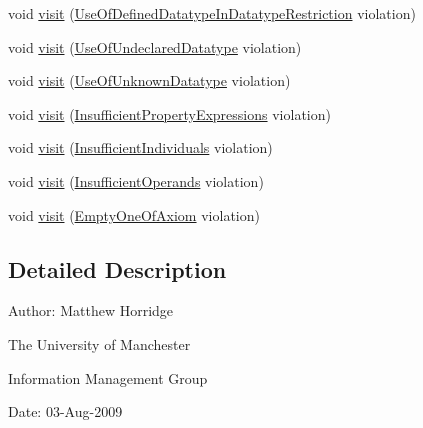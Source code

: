 \begin{DoxyCompactItemize}
\item 
void \hyperlink{interfaceorg_1_1semanticweb_1_1owlapi_1_1profiles_1_1_o_w_l2_profile_violation_visitor_a5df8a27131f27b257a3e48016ae8f249}{visit} (\hyperlink{classorg_1_1semanticweb_1_1owlapi_1_1profiles_1_1_use_of_defined_datatype_in_datatype_restriction}{Use\-Of\-Defined\-Datatype\-In\-Datatype\-Restriction} violation)
\item 
void \hyperlink{interfaceorg_1_1semanticweb_1_1owlapi_1_1profiles_1_1_o_w_l2_profile_violation_visitor_adde3c5181b195728efc45c667057193c}{visit} (\hyperlink{classorg_1_1semanticweb_1_1owlapi_1_1profiles_1_1_use_of_undeclared_datatype}{Use\-Of\-Undeclared\-Datatype} violation)
\item 
void \hyperlink{interfaceorg_1_1semanticweb_1_1owlapi_1_1profiles_1_1_o_w_l2_profile_violation_visitor_a05ed324b2c069fd3b197cdeae61a5e42}{visit} (\hyperlink{classorg_1_1semanticweb_1_1owlapi_1_1profiles_1_1_use_of_unknown_datatype}{Use\-Of\-Unknown\-Datatype} violation)
\item 
void \hyperlink{interfaceorg_1_1semanticweb_1_1owlapi_1_1profiles_1_1_o_w_l2_profile_violation_visitor_a735db5f3b4ad0df17a7faa32c4bdeda8}{visit} (\hyperlink{classorg_1_1semanticweb_1_1owlapi_1_1profiles_1_1_insufficient_property_expressions}{Insufficient\-Property\-Expressions} violation)
\item 
void \hyperlink{interfaceorg_1_1semanticweb_1_1owlapi_1_1profiles_1_1_o_w_l2_profile_violation_visitor_a906037ef8cf204ccd36a44aa2a122146}{visit} (\hyperlink{classorg_1_1semanticweb_1_1owlapi_1_1profiles_1_1_insufficient_individuals}{Insufficient\-Individuals} violation)
\item 
void \hyperlink{interfaceorg_1_1semanticweb_1_1owlapi_1_1profiles_1_1_o_w_l2_profile_violation_visitor_a5606e730dc87b14de6803153ceebd3ee}{visit} (\hyperlink{classorg_1_1semanticweb_1_1owlapi_1_1profiles_1_1_insufficient_operands}{Insufficient\-Operands} violation)
\item 
void \hyperlink{interfaceorg_1_1semanticweb_1_1owlapi_1_1profiles_1_1_o_w_l2_profile_violation_visitor_a316162646634bd3266a1d97d6ea1ebfe}{visit} (\hyperlink{classorg_1_1semanticweb_1_1owlapi_1_1profiles_1_1_empty_one_of_axiom}{Empty\-One\-Of\-Axiom} violation)
\end{DoxyCompactItemize}


\subsection{Detailed Description}
Author\-: Matthew Horridge\par
 The University of Manchester\par
 Information Management Group\par
 Date\-: 03-\/\-Aug-\/2009 

